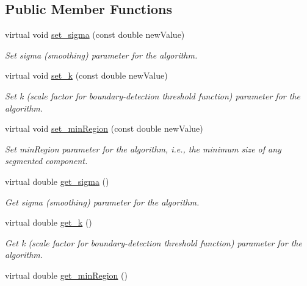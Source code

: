 \subsection*{Public Member Functions}
\begin{DoxyCompactItemize}
\item 
virtual void \mbox{\hyperlink{classyarp_1_1sig_1_1SegmentationModuleInterface_a68f28930df5e930934c0ee56ad1f680c}{set\+\_\+sigma}} (const double new\+Value)
\begin{DoxyCompactList}\small\item\em Set sigma (smoothing) parameter for the algorithm. \end{DoxyCompactList}\item 
virtual void \mbox{\hyperlink{classyarp_1_1sig_1_1SegmentationModuleInterface_a2851eae0226ad68f41cd8b61d8bb1456}{set\+\_\+k}} (const double new\+Value)
\begin{DoxyCompactList}\small\item\em Set k (scale factor for boundary-\/detection threshold function) parameter for the algorithm. \end{DoxyCompactList}\item 
virtual void \mbox{\hyperlink{classyarp_1_1sig_1_1SegmentationModuleInterface_ad9d90ed7e362ae83e2145445a9c4301e}{set\+\_\+min\+Region}} (const double new\+Value)
\begin{DoxyCompactList}\small\item\em Set min\+Region parameter for the algorithm, i.\+e., the minimum size of any segmented component. \end{DoxyCompactList}\item 
virtual double \mbox{\hyperlink{classyarp_1_1sig_1_1SegmentationModuleInterface_a38431f2c63d7da8ebf20adf0ed1da4fe}{get\+\_\+sigma}} ()
\begin{DoxyCompactList}\small\item\em Get sigma (smoothing) parameter for the algorithm. \end{DoxyCompactList}\item 
virtual double \mbox{\hyperlink{classyarp_1_1sig_1_1SegmentationModuleInterface_a91f3d872a48599337d1d2f365ac4c31e}{get\+\_\+k}} ()
\begin{DoxyCompactList}\small\item\em Get k (scale factor for boundary-\/detection threshold function) parameter for the algorithm. \end{DoxyCompactList}\item 
virtual double \mbox{\hyperlink{classyarp_1_1sig_1_1SegmentationModuleInterface_a6c184aeea894f6afcc342c5aa748429d}{get\+\_\+min\+Region}} ()

\end{DoxyCompactItemize}
